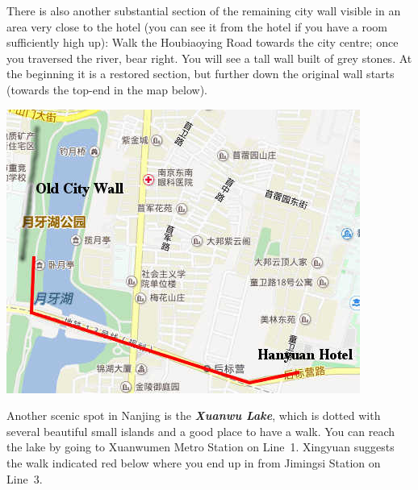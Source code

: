 \documentclass[11pt]{report}
\begin{document}
\begin{itemize}
\noindent There is also another substantial section of the
remaining city wall visible in an area very close to the hotel
(you can see it from the hotel if you have a room sufficiently
high up): Walk the Houbiaoying Road towards the city centre;
once you traversed the river, bear right. You will see a tall
wall built of grey stones. At the beginning it is a restored
section, but further down the original wall starts (towards the
top-end in the map below).

\begin{center}
\includegraphics[scale=0.4]{travel_guide/map5.jpg}
\end{center}

Another scenic spot in Nanjing is the \textbf{\textit{Xuanwu
Lake}}, which is dotted with several beautiful small islands
and a good place to have a walk. You can reach the lake by
going to Xuanwumen Metro Station on Line~1. Xingyuan suggests
the walk indicated red below where you end up in from Jimingsi
Station on Line~3.



\end{itemize}
\end{document}
